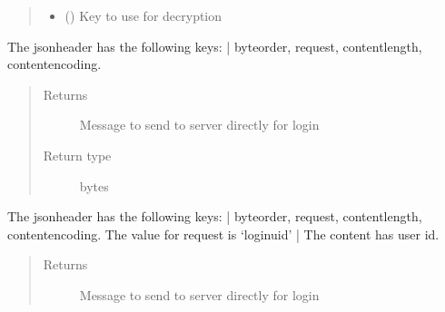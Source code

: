 \documentclass[letterpaper,10pt,english]{sphinxmanual}
\begin{document}
\begin{fulllineitems}
\begin{fulllineitems}
\begin{quote}
\begin{description}
\begin{itemize}
\item {} 
 () \textendash{} Key to use for decryption

\end{itemize}

\end{description}\end{quote}

\end{fulllineitems}


\begin{fulllineitems}
\label{\detokenize{Message:Message.Message._create_loginpass_request}}
The jsonheader has the following keys: |
byteorder, request, content\sphinxhyphen{}length, content\sphinxhyphen{}encoding.
\begin{quote}\begin{description}
\item[{Returns}] \leavevmode
Message to send to server directly for login

\item[{Return type}] \leavevmode
bytes

\end{description}\end{quote}

\end{fulllineitems}


\begin{fulllineitems}
\label{\detokenize{Message:Message.Message._create_loginuid_request}}
The jsonheader has the following keys: |
byteorder, request, content\sphinxhyphen{}length, content\sphinxhyphen{}encoding. The value for request is ‘loginuid’ |
The content has user id.
\begin{quote}\begin{description}
\item[{Returns}] \leavevmode
Message to send to server directly for login


\end{description}
\end{quote}
\end{fulllineitems}
\end{fulllineitems}
\end{document}
